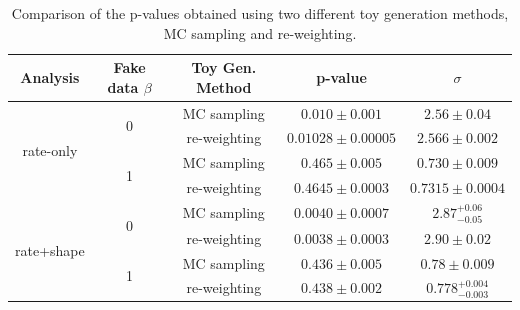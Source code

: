 \begin{table}[H]
\centering
\begin{tabular}{|c|c|c|c|c|}
	\hline
	Analysis                    & Fake data $\beta$   & Toy Gen. Method         & p-value              & $\sigma$               \\
	\hline
	
	
	\multirow{4}{*}{rate-only}  & \multirow{ 2}{*}{0} & MC sampling             & $0.010 \pm 0.001$    & $2.56 \pm 0.04$          \\
	\cline{3-5}
	                            &                     & re-weighting            & $0.01028 \pm 0.00005$& $2.566 \pm 0.002$        \\
	\cline{2-5}
	                            & \multirow{ 2}{*}{1} & MC sampling             & $0.465 \pm 0.005$    & $0.730 \pm 0.009$        \\
	\cline{3-5}
	                            &                     & re-weighting            & $0.4645 \pm 0.0003$  & $0.7315 \pm 0.0004$      \\
	\hline
	
	
	\multirow{4}{*}{rate+shape} & \multirow{ 2}{*}{0} & MC sampling             & $0.0040 \pm 0.0007$  & $2.87^{+0.06}_{-0.05}$   \\
	\cline{3-5}
	                            &                     & re-weighting            & $0.0038 \pm 0.0003$  & $2.90 \pm 0.02$          \\
	\cline{2-5}
	                            & \multirow{ 2}{*}{1} & MC sampling             & $0.436 \pm 0.005$    & $0.78 \pm 0.009$         \\
	\cline{3-5}
	                            &                     & re-weighting            & $0.438 \pm 0.002$    & $0.778^{+0.004}_{-0.003}$\\
	\hline
	
	
\end{tabular}
\caption{
	Comparison of the p-values obtained using two different toy generation methods, MC sampling and re-weighting.
}
\label{tab:sampling_vs_reweighting_pvals}
\end{table}

